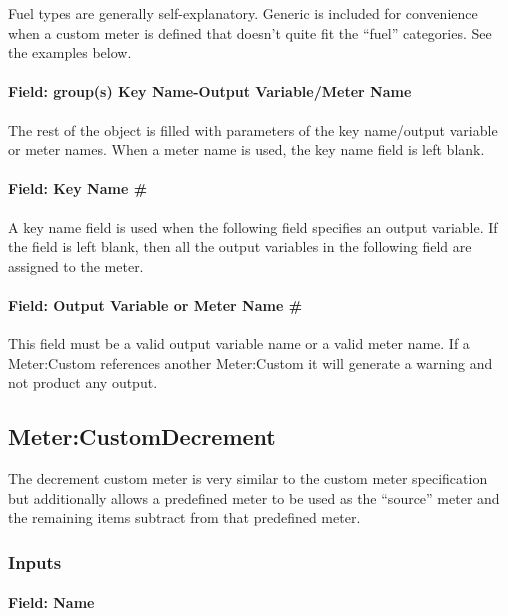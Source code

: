 Fuel types are generally self-explanatory. Generic is included for convenience when a custom meter is defined that doesn't quite fit the ``fuel'' categories. See the examples below.

\paragraph{Field: group(s) Key Name-Output Variable/Meter Name}\label{field-groups-key-name-output-variablemeter-name}

The rest of the object is filled with parameters of the key name/output variable or meter names. When a meter name is used, the key name field is left blank.

\paragraph{Field: Key Name \#}\label{field-key-name}

A key name field is used when the following field specifies an output variable. If the field is left blank, then all the output variables in the following field are assigned to the meter.

\paragraph{Field: Output Variable or Meter Name \#}\label{field-output-variable-or-meter-name}

This field must be a valid output variable name or a valid meter name. If a Meter:Custom references another Meter:Custom it will generate a warning and not product any output.

\subsection{Meter:CustomDecrement}\label{metercustomdecrement}

The decrement custom meter is very similar to the custom meter specification but additionally allows a predefined meter to be used as the ``source'' meter and the remaining items subtract from that predefined meter.

\subsubsection{Inputs}\label{inputs-18-008}

\paragraph{Field: Name}\label{field-name-1-040}

